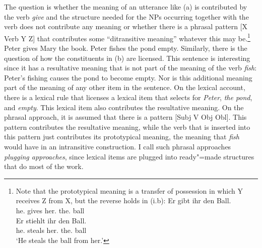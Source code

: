 The question is whether the meaning of an utterance like (a) is contributed by the verb
\emph{give} and the structure needed for the NPs occurring together with the verb does not contribute any meaning
or whether there is a phrasal pattern [X Verb Y Z] that contributes some ``ditransitive meaning''
whatever this may be.\footnote{
Note that the prototypical meaning is a transfer of possession in which Y receives Z from X, but the
reverse holds in (i.b):
\eal
\ex 
\gll Er gibt ihr den Ball.\\
     he.\nom{} gives her.\dat{} the.\acc{} ball\\
\ex
\gll Er stiehlt ihr den Ball.\\
     he.\nom{} steals  her.\dat{} the.\acc{} ball\\
\glt `He steals the ball from her.'
\zllast
}
\eal
\ex Peter gives Mary the book.
\ex Peter fishes the pond empty.
\zl
Similarly, there is the question of how the constituents in (b) are licensed. This sentence is
interesting since it has a resultative meaning that is not part of the meaning of the verb
\emph{fish}: Peter's fishing causes the pond to become empty. Nor is this additional meaning part of
the meaning of any other item in the sentence. On the lexical account,
there is a lexical rule that licenses a lexical item that selects for \emph{Peter}, \emph{the pond},
and \emph{empty}. This lexical item also contributes the resultative meaning. On the phrasal
approach, it is assumed that there is a pattern [Subj V Obj Obl]. This pattern contributes the
resultative meaning, while the verb that is inserted into this pattern just contributes its
prototypical meaning, \eg the meaning that \emph{fish} would have in an
intransitive construction. I call such phrasal approaches \emph{plugging approaches}, since lexical
items are plugged into ready"=made structures that do most of the work.

